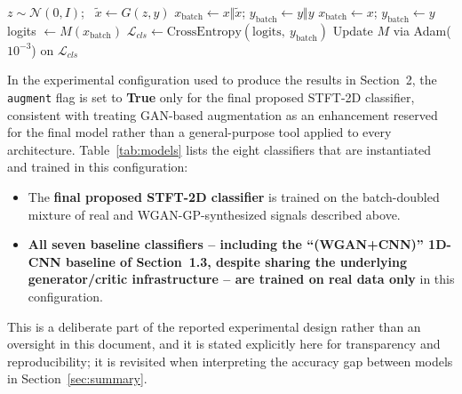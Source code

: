 \documentclass[12pt]{article}
\begin{document}
\begin{algorithm}[H]
\caption{Stage 2 -- Classifier training (one epoch, for a given classifier $M$)}
\label{alg:classifier}
\begin{algorithmic}[1]
        \State $z \sim \mathcal{N}(0, I)$; \ $\tilde{x} \gets G(z, y)$ 
        \State $x_{\text{batch}} \gets x \Vert \tilde{x}$; \quad $y_{\text{batch}} \gets y \Vert y$
    \Else
        \State $x_{\text{batch}} \gets x$; \quad $y_{\text{batch}} \gets y$
    \EndIf
    \State logits $\gets M(x_{\text{batch}})$
    \State $\mathcal{L}_{cls} \gets \text{CrossEntropy}(\text{logits},\ y_{\text{batch}})$ 
    \State Update $M$ via Adam($10^{-3}$) on $\mathcal{L}_{cls}$
\EndFor
\end{algorithmic}
\end{algorithm}

In the experimental configuration used to produce the results in Section~2, the \texttt{augment} flag is set to \textbf{True} only for the final proposed STFT-2D classifier, consistent with treating GAN-based augmentation as an enhancement reserved for the final model rather than a general-purpose tool applied to every architecture. Table~\ref{tab:models} lists the eight classifiers that are instantiated and trained in this configuration:

\begin{itemize}
    \item The \textbf{final proposed STFT-2D classifier} is trained on the batch-doubled mixture of real and WGAN-GP-synthesized signals described above.
    \item \textbf{All seven baseline classifiers -- including the ``(WGAN+CNN)'' 1D-CNN baseline of Section~1.3, despite sharing the underlying generator/critic infrastructure -- are trained on real data only} in this configuration.
\end{itemize}

This is a deliberate part of the reported experimental design rather than an oversight in this document, and it is stated explicitly here for transparency and reproducibility; it is revisited when interpreting the accuracy gap between models in Section~\ref{sec:summary}.
\end{document}
